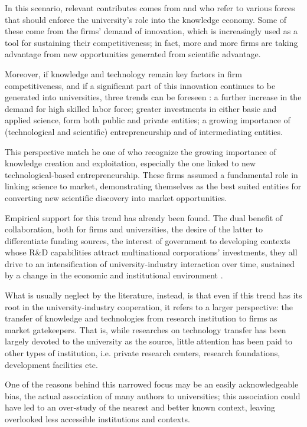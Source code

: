 In this scenario, relevant contributes comes from \citet{OShea2004} and \citet{Yusuf2008} who refer to various forces that should enforce the university's role into the knowledge economy. Some of these come from the firms' demand of innovation, which is increasingly used as a tool for sustaining their competitiveness; in fact, more and more firms are taking advantage from new opportunities generated from scientific advantage. 

Moreover, if knowledge and technology remain key factors in firm competitiveness, and if a significant part of this innovation continues to be generated into universities, three trends can be foreseen \citep{Yusuf2008}: a further increase in the demand for high skilled labor force; greater investments in either basic and applied science, form both public and private entities; a growing importance of (technological and scientific) entrepreneurship and of intermediating entities. 

This perspective match he one of \citet{OShea2004} who recognize the growing importance of knowledge creation and exploitation, especially the one linked to new technological-based entrepreneurship. These firms assumed a fundamental role in linking science to market, demonstrating themselves as the best suited entities for converting new scientific discovery into market opportunities. 

Empirical support for this trend has already been found. The dual benefit of collaboration, both for firms and universities, the desire of the latter to differentiate funding sources, the interest of government to developing contexts whose R\&D capabilities attract multinational corporations' investments, they all drive to an intensification of university-industry interaction over time, sustained by a change in the economic and institutional environment \citep{Debackere2005}.

What is usually neglect by the literature, instead, is that even if this trend has its root in the university-industry cooperation, it refers to a larger perspective: the transfer of knowledge and technologies from research institution to firms as market gatekeepers. That is, while researches on technology transfer has been largely devoted to the university as the source, little attention has been paid to other types of institution, i.e. private research centers, research foundations, development facilities etc.

One of the reasons behind this narrowed focus may be an easily acknowledgeable bias, the actual association of many authors to universities; this association could have led to an over-study of the nearest and better known context, leaving overlooked less accessible institutions and contexts.

